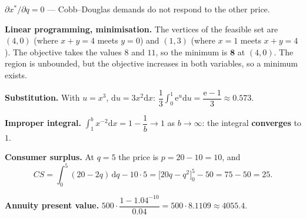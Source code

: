 \begin{solutions}
        $\partial x^{*}/\partial q=0$ --- Cobb--Douglas demands do not
        respond to the other price.
  \item \textbf{Linear programming, minimisation.} The vertices of the
        feasible set are $(4,0)$ (where $x+y=4$ meets $y=0$) and $(1,3)$
        (where $x=1$ meets $x+y=4$). The objective takes the values
        $8$ and $11$, so the minimum is $\mathbf{8}$ at $(4,0)$. The region
        is unbounded, but the objective increases in both variables, so a
        minimum exists.
  \item \textbf{Substitution.} With $u=x^{3}$, $\mathrm{d}u=3x^{2}
        \mathrm{d}x$:
        $\dfrac13\displaystyle\int_{0}^{1}\mathrm{e}^{u}\mathrm{d}u
        =\dfrac{\mathrm{e}-1}{3}\approx0.573$.
  \item \textbf{Improper integral.}
        $\displaystyle\int_{1}^{b}x^{-2}\mathrm{d}x
        =1-\dfrac1b\to1$ as $b\to\infty$: the integral \textbf{converges}
        to $1$.
  \item \textbf{Consumer surplus.} At $q=5$ the price is
        $p=20-10=10$, and
        \[
          CS=\int_{0}^{5}(20-2q)\,\mathrm{d}q-10\cdot5
            =\bigl[20q-q^{2}\bigr]_{0}^{5}-50
            =75-50=25 .
        \]
  \item \textbf{Annuity present value.}
        $500\cdot\dfrac{1-1.04^{-10}}{0.04}
        =500\cdot8.1109\approx4055.4$.
\end{solutions}
